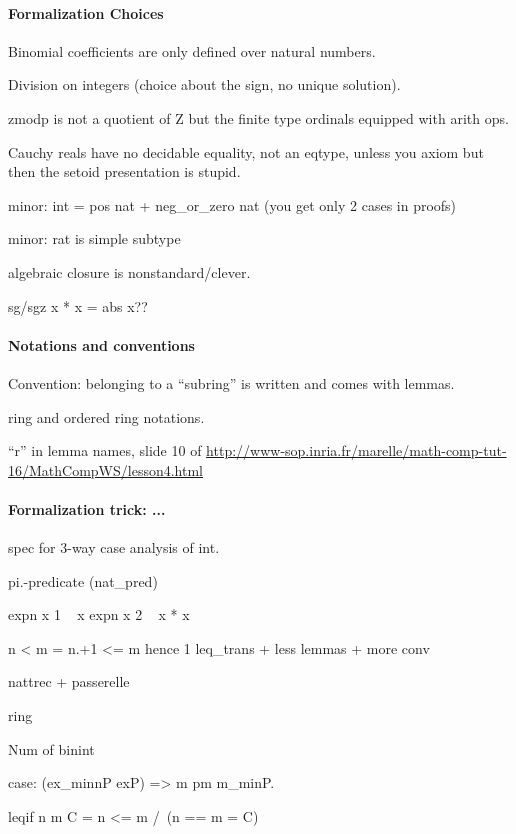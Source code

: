 \paragraph{Formalization Choices}

Binomial coefficients are only defined over natural numbers.

Division on integers (choice about the sign, no unique solution).

zmodp is not a quotient of Z but the finite type ordinals equipped with
arith ops.

Cauchy reals have no decidable equality, not an eqtype, unless you axiom
but then the setoid presentation is stupid.

minor: int = pos nat + neg\_or\_zero nat (you get only 2 cases in proofs)

minor: rat is simple subtype

algebraic closure is nonstandard/clever.

sg/sgz x * x = abs x??

\paragraph{Notations and conventions}

Convention: belonging to a ``subring'' is written 
and comes with lemmas.

ring and ordered ring notations.

``r'' in lemma names, slide 10 of
\url{http://www-sop.inria.fr/marelle/math-comp-tut-16/MathCompWS/lesson4.html}

\paragraph{Formalization trick: ...}

spec for 3-way case analysis of int.

pi.-predicate (nat\_pred)

expn x 1 ~ x
expn x 2 ~ x * x

n < m = n.+1 <= m hence 1 leq\_trans + less lemmas + more conv

nattrec + passerelle

ring

Num of binint

case: (ex\_minnP exP) => m pm m\_minP.

leqif n m C   =   n <= m /\ (n == m = C)

